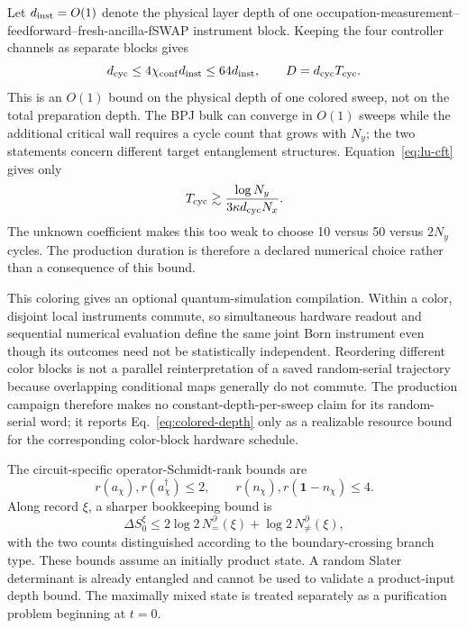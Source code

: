 \documentclass[aps,prx,twocolumn,floatfix,nofootinbib,superscriptaddress,longbibliography]{revtex4-2}
\begin{document}
Let $d_{\rm inst}=O(1)$ denote the physical layer depth of one
occupation-measurement--feedforward--fresh-ancilla-fSWAP instrument block.  Keeping the four
controller channels as separate blocks gives
\begin{equation}
 d_{\rm cyc}\le4\chi_{\rm conf}d_{\rm inst}\le64d_{\rm inst},
 \qquad D=d_{\rm cyc}T_{\rm cyc}.
 \label{eq:colored-depth}
\end{equation}
This is an $O(1)$ bound on the physical depth of one colored sweep, not on the total
preparation depth.  The BPJ bulk can converge in $O(1)$ sweeps while the additional
critical wall requires a cycle count that grows with $N_y$; the two statements concern
different target entanglement structures.
Equation~\eqref{eq:lu-cft} gives only
\begin{equation}
 T_{\rm cyc}\gtrsim
 \frac{\log N_y}{3\kappa d_{\rm cyc}N_x}.
 \label{eq:lu-cycles}
\end{equation}
The unknown coefficient makes this too weak to choose 10 versus 50 versus $2N_y$ cycles.
The production duration is therefore a declared numerical choice rather than a consequence
of this bound.

This coloring gives an optional quantum-simulation compilation.  Within a color, disjoint
local instruments commute, so simultaneous hardware readout and sequential numerical
evaluation define the same joint Born instrument even though its outcomes need not be
statistically independent.  Reordering different color blocks is not a parallel
reinterpretation of a saved random-serial trajectory because overlapping conditional maps
generally do not commute.  The production campaign therefore makes no
constant-depth-per-sweep claim for its random-serial word; it reports
Eq.~\eqref{eq:colored-depth} only as a realizable resource bound for the corresponding
color-block hardware schedule.

The circuit-specific operator-Schmidt-rank bounds are
\begin{equation}
 r(a_\chi),r(a_\chi^\dagger)\le2,
 \qquad r(n_\chi),r(\mathbf{1}-n_\chi)\le4.
\end{equation}
Along record $\xi$, a sharper bookkeeping bound is
\begin{equation}
 \Delta S_0^\xi
 \le 2\log2\,N_{=}^{\partial}(\xi)
 +\log2\,N_{\ne}^{\partial}(\xi),
\end{equation}
with the two counts distinguished according to the boundary-crossing branch type.  These
bounds assume an initially product state.  A random Slater determinant is already
entangled and cannot be used to validate a product-input depth bound.  The maximally mixed
state is treated separately as a purification problem beginning at $t=0$.
\end{document}
